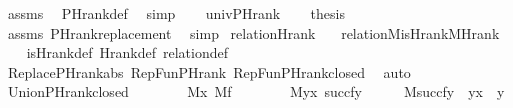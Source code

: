 \begin{isabellebody}
\ assms\ \isamarkupfalse%
\ PHrank{\isacharunderscore}{\kern0pt}def\ \isamarkupfalse%
\ simp\isanewline
\ \ \isamarkupfalse%
\ univ{\isacharunderscore}{\kern0pt}PHrank\isanewline
\ \ \isamarkupfalse%
\ {\isacharquery}{\kern0pt}thesis\ \isamarkupfalse%
\ assms\ PHrank{\isacharunderscore}{\kern0pt}replacement\ \isamarkupfalse%
\ simp\isanewline
{}\isamarkupfalse%
%
\endisatagproof
{\isafoldproof}%
%
\isadelimproof
\isanewline
%
\endisadelimproof
\isanewline
{}\isamarkupfalse%
\ relation{}{\isacharunderscore}{\kern0pt}Hrank\ {\isacharcolon}{\kern0pt}\isanewline
\ \ {\isachardoublequoteopen}relation{}{\isacharparenleft}{\kern0pt}M{\isacharcomma}{\kern0pt}is{\isacharunderscore}{\kern0pt}Hrank{\isacharparenleft}{\kern0pt}M{\isacharparenright}{\kern0pt}{\isacharcomma}{\kern0pt}Hrank{\isacharparenright}{\kern0pt}{\isachardoublequoteclose}\isanewline
%
\isadelimproof
\ \ %
\endisadelimproof
%
\isatagproof
{}\isamarkupfalse%
\ is{\isacharunderscore}{\kern0pt}Hrank{\isacharunderscore}{\kern0pt}def\ Hrank{\isacharunderscore}{\kern0pt}def\ relation{}{\isacharunderscore}{\kern0pt}def\isanewline
\ \ \isamarkupfalse%
\ Replace{\isacharunderscore}{\kern0pt}PHrank{\isacharunderscore}{\kern0pt}abs\ RepFun{\isacharunderscore}{\kern0pt}PHrank\ RepFun{\isacharunderscore}{\kern0pt}PHrank{\isacharunderscore}{\kern0pt}closed\ \isamarkupfalse%
\ auto%
\endisatagproof
{\isafoldproof}%
%
\isadelimproof
\isanewline
%
\endisadelimproof
\isanewline
\isanewline
{}\isamarkupfalse%
\ Union{\isacharunderscore}{\kern0pt}PHrank{\isacharunderscore}{\kern0pt}closed{\isacharcolon}{\kern0pt}\isanewline
\ \ \ \isanewline
\ \ \ \ {\isachardoublequoteopen}M{\isacharparenleft}{\kern0pt}x{\isacharparenright}{\kern0pt}{\isachardoublequoteclose}\ {\isachardoublequoteopen}M{\isacharparenleft}{\kern0pt}f{\isacharparenright}{\kern0pt}{\isachardoublequoteclose}\isanewline
\ \ \ \isanewline
\ \ \ \ {\isachardoublequoteopen}M{\isacharparenleft}{\kern0pt}{\isasymUnion}y{\isasymin}x{\isachardot}{\kern0pt}\ succ{\isacharparenleft}{\kern0pt}f{\isacharbackquote}{\kern0pt}y{\isacharparenright}{\kern0pt}{\isacharparenright}{\kern0pt}{\isachardoublequoteclose}\isanewline
%
\isadelimproof
%
\endisadelimproof
%
\isatagproof
{}\isamarkupfalse%
\ {\isacharminus}{\kern0pt}\isanewline
\ \ \isamarkupfalse%
\ {\isachardoublequoteopen}M{\isacharparenleft}{\kern0pt}succ{\isacharparenleft}{\kern0pt}f{\isacharbackquote}{\kern0pt}y{\isacharparenright}{\kern0pt}{\isacharparenright}{\kern0pt}{\isachardoublequoteclose}\ \ {\isachardoublequoteopen}y{\isasymin}x{\isachardoublequoteclose}\ \ y\isanewline

\end{isabellebody}
